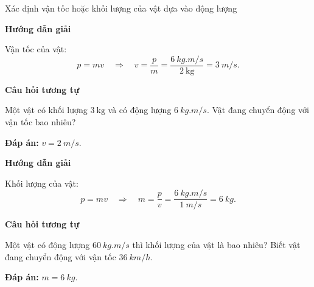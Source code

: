 \begin{dang}{Xác định vận tốc hoặc khối lượng của vật dựa vào động lượng}
	{	\begin{center}
			\textbf{Hướng dẫn giải}
		\end{center}
		
		Vận tốc của vật: $$p=mv\quad\Rightarrow\quad v=\dfrac{p}{m}=\dfrac{\SI{6}{kg.m/s}}{\SI{2}{\kilogram}}=\SI{3}{m/s}.$$
		
		\begin{center}
			\textbf{Câu hỏi tương tự}
		\end{center}
		
		Một vật có khối lượng $\SI{3}{\kilogram}$ và có động lượng $\SI{6}{kg.m/s}$. Vật đang chuyển động với vận tốc bao nhiêu?
		
		\textbf{Đáp án:} $v=\SI{2}{m/s}$.
	}
	{	\begin{center}
			\textbf{Hướng dẫn giải}
		\end{center}
		
		Khối lượng của vật: $$p=mv\quad\Rightarrow\quad m=\dfrac{p}{v}=\dfrac{\SI{6}{kg.m/s}}{\SI{1}{m/s}}=\SI{6}{kg}.$$
		
		\begin{center}
			\textbf{Câu hỏi tương tự}
		\end{center}
		
		Một vật có động lượng $\SI{60}{kg.m/s}$ thì khối lượng của vật là bao nhiêu? Biết vật đang chuyển động với vận tốc $\SI{36}{km/h}$.
		
		\textbf{Đáp án:} $m=\SI{6}{kg}$.
	}
\end{dang}
